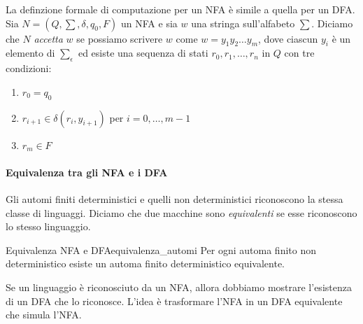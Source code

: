 \documentclass[12pt]{report}
\newcounter{theorem}
\newcommand{\nmu}{}
\begin{document}
	La definzione formale di computazione per un NFA è simile a quella per un DFA. Sia $N=(Q, \sum, \delta, q_0, F)$ un NFA e sia $w$ una stringa sull'alfabeto $\sum$. Diciamo che $N$ \textit{accetta} $w$ se possiamo scrivere $w$ come $w = y_1y_2\dots y_m$, dove ciascun $y_i$ è un elemento di $\sum_\epsilon$ ed esiste una sequenza di stati $r_0, r_1, \dots, r_n$ in $Q$ con tre condizioni:
	\begin{enumerate}
		\item $r_0 = q_0$
		\item $r_{i+1} \in \delta(r_i, y_{i+1})$ per $i = 0, \dots, m-1$
		\item $r_m \in F$
	\end{enumerate}
	\paragraph{Equivalenza tra gli NFA e i DFA} Gli automi finiti deterministici e quelli non deterministici riconoscono la stessa classe di linguaggi. Diciamo che due macchine sono \textit{equivalenti} se esse riconoscono lo stesso linguaggio.
	\begin{theorem}{\nmu Equivalenza NFA e DFA}{equivalenza_automi}
		Per ogni automa finito non deterministico esiste un automa finito deterministico equivalente.
	\end{theorem}
	Se un linguaggio è riconosciuto da un NFA, allora dobbiamo mostrare l'esistenza di un DFA che lo riconosce. L'idea è trasformare l'NFA in un DFA equivalente che simula l'NFA.
\end{document}
